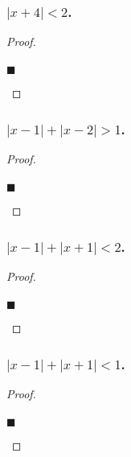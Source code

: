 \documentclass[letterpaper, 10 pt, conference]{ieeeconf}  %
\begin{document}
\subsubsection{\textbf{$\left\lvert x + 4 \right\rvert < 2$.}}
\begin{proof}
\begin{align}
    
\end{align}
\begin{flushright}
$\blacksquare$
\end{flushright}
\end{proof}

\subsubsection{\textbf{$\left\lvert x - 1 \right\rvert + \left\lvert x - 2 \right\rvert > 1$.}}
\begin{proof}
\begin{align}
    
\end{align}
\begin{flushright}
$\blacksquare$
\end{flushright}
\end{proof}

\subsubsection{\textbf{$\left\lvert x - 1 \right\rvert + \left\lvert x + 1 \right\rvert < 2$.}}
\begin{proof}
\begin{align}
    
\end{align}
\begin{flushright}
$\blacksquare$
\end{flushright}
\end{proof}

\subsubsection{\textbf{$\left\lvert x - 1 \right\rvert + \left\lvert x + 1 \right\rvert < 1$.}}
\begin{proof}
\begin{align}
    
\end{align}
\begin{flushright}
$\blacksquare$
\end{flushright}
\end{proof}
\end{document}
